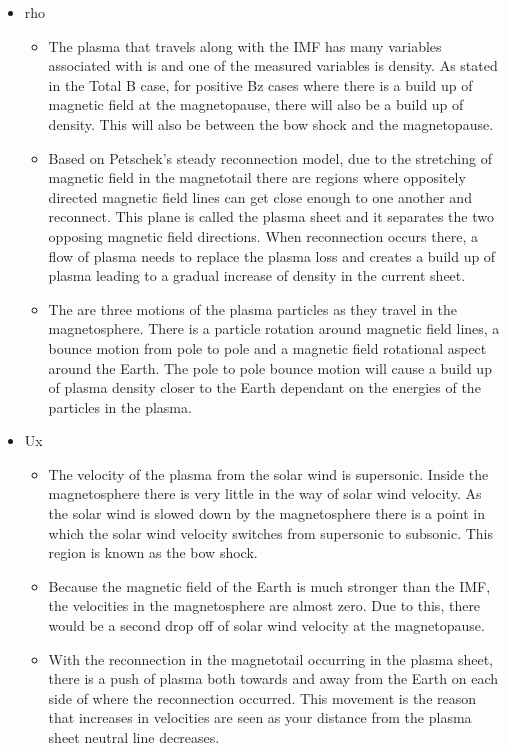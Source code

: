 \begin{itemize}
	\item rho
	\begin{itemize}
		\item The plasma that travels along with the IMF has many variables associated
		with is and one of the measured variables is density. As stated in the Total B
		case, for positive Bz cases where there is a build up of magnetic field at
		the magnetopause, there will also be a build up of density. This will also be
		between the bow shock and the magnetopause.
		\item Based on Petschek's steady reconnection model, due to the
		stretching of magnetic field in the magnetotail there are regions where
		oppositely directed magnetic field lines can get close enough to one
		another and reconnect. This plane is called the plasma sheet and it separates
		the two opposing magnetic field directions. When reconnection occurs there, a
		flow of plasma needs to replace the plasma loss and creates a build up of
		plasma leading to a gradual increase of density in the current sheet.
		\item The are three motions of the plasma particles as they travel in the
		magnetosphere. There is a particle rotation around magnetic field lines, a
		bounce motion from pole to pole and a magnetic field rotational aspect around
		the Earth. The pole to pole bounce motion will cause a build up of plasma
		density closer to the Earth dependant on the energies of the
		particles in the plasma. 
	\end{itemize}
	
	\item Ux
	\begin{itemize}
		\item The velocity of the plasma from the solar wind is supersonic. Inside the
		magnetosphere there is very little in the way of solar wind velocity. As the
		solar wind is slowed down by the magnetosphere there is a point in which the
		solar wind velocity switches from supersonic to subsonic. This region is known
		as the bow shock.
		\item Because the magnetic field of the Earth is much stronger than the IMF,
		the velocities in the magnetosphere are almost zero. Due to this, there would
		be a second drop off of solar wind velocity at the magnetopause.
		\item With the reconnection in the magnetotail occurring in the plasma sheet,
		there is a push of plasma both towards and away from the Earth on each side of
		where the reconnection occurred. This movement is the reason that increases in
		velocities are seen as your distance from the plasma sheet neutral line
		decreases.
	\end{itemize}
\end{itemize}


